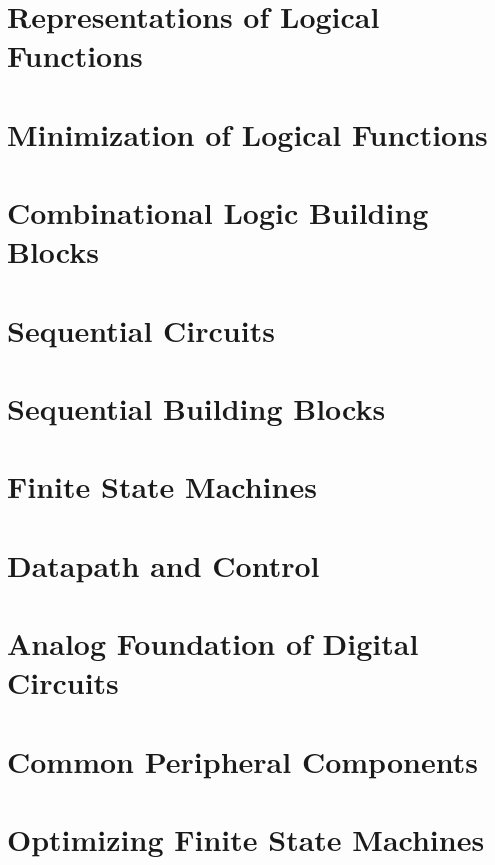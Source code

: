\documentclass[letterpaper, 10pt]{memoir}
\begin{document}
\chapter{Representations of Logical Functions}


\chapter{Minimization of Logical Functions}


\chapter{Combinational Logic Building Blocks}


\chapter{Sequential Circuits}


\chapter{Sequential Building Blocks}



\chapter{Finite State Machines}



\chapter{Datapath and Control}



\chapter{Analog Foundation of Digital Circuits}



\chapter{Common Peripheral Components}


\chapter{Optimizing Finite State Machines}

\end{document}
